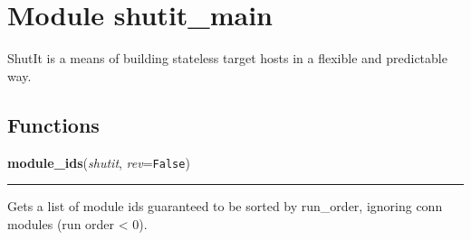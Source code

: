 %
%
%


\section{Module shutit\_main}

    \label{shutit_main}
ShutIt is a means of building stateless target hosts in a flexible and 
predictable way.



  \subsection{Functions}

    \label{shutit_main:module_ids}

    \vspace{0.5ex}

\hspace{.8\funcindent}\begin{boxedminipage}{\funcwidth}

    \raggedright \textbf{module\_ids}(\textit{shutit}, \textit{rev}={\tt False})

    \vspace{-1.5ex}

    \rule{\textwidth}{0.5\fboxrule}
\setlength{\parskip}{2ex}
    Gets a list of module ids guaranteed to be sorted by run\_order, 
    ignoring conn modules (run order {\textless} 0).

\setlength{\parskip}{1ex}
    \end{boxedminipage}

    \label{shutit_main:allowed_module_ids}

    \vspace{0.5ex}

